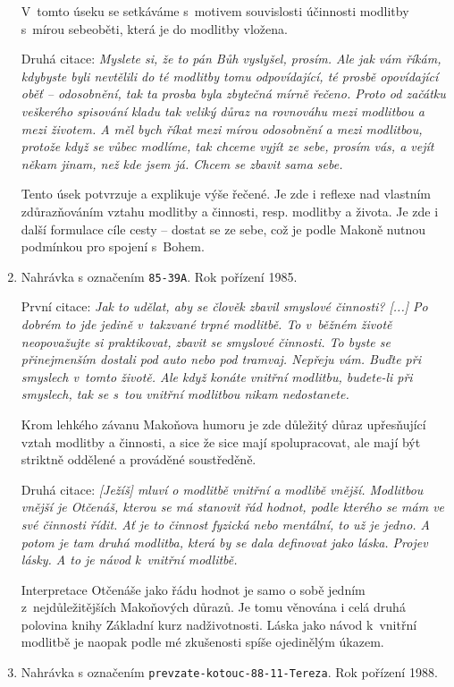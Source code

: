 \begin{enumerate}
{    V~tomto úseku se setkáváme s~motivem souvislosti účinnosti modlitby s~mírou
    sebeoběti, která je do modlitby vložena.

    Druhá citace: \textit{%
      Myslete si, že to pán Bůh vyslyšel, prosím. Ale jak vám říkám, kdybyste
      byli nevtělili do té modlitby tomu odpovídající, té prosbě opovídající
      oběť -- odosobnění, tak ta prosba byla zbytečná mírně řečeno. Proto od
      začátku veškerého spisování kladu tak veliký důraz na rovnováhu mezi
      modlitbou a mezi životem. A měl bych říkat mezi mírou odosobnění a mezi
      modlitbou, protože když se vůbec modlíme, tak chceme vyjít ze sebe, prosím
      vás, a vejít někam jinam, než kde jsem já. Chcem se zbavit sama sebe.
    }

    Tento úsek potvrzuje a explikuje výše řečené. Je zde i reflexe nad vlastním
    zdůrazňováním vztahu modlitby a činnosti, resp. modlitby a života. Je zde i
    další formulace cíle cesty -- dostat se ze sebe, což je podle Makoně nutnou
    podmínkou pro spojení s~Bohem.
  }
  \item{
    Nahrávka s označením \texttt{85-39A}.
    Rok pořízení 1985.

    První citace: \textit{%
      Jak to udělat, aby se člověk zbavil smyslové činnosti? [...] Po dobrém to
      jde jedině v~takzvané trpné modlitbě. To v~běžném životě neopovažujte si
      praktikovat, zbavit se smyslové činnosti. To byste se přinejmenším dostali
      pod auto nebo pod tramvaj. Nepřeju vám. Buďte při smyslech v~tomto životě.
      Ale když konáte vnitřní modlitbu, budete-li při smyslech, tak se s~tou
      vnitřní modlitbou nikam nedostanete.
    }

    Krom lehkého závanu Makoňova humoru je zde důležitý důraz upřesňující vztah
    modlitby a činnosti, a sice že sice mají spolupracovat, ale mají být
    striktně oddělené a prováděné soustředěně.

    Druhá citace: \textit{%
      [Ježíš] mluví o modlitbě vnitřní a modlibě vnější. Modlitbou vnější je
      Otčenáš, kterou se má stanovit řád hodnot, podle kterého se mám ve své
      činnosti řídit. Ať je to činnost fyzická nebo mentální, to už je jedno. A
      potom je tam druhá modlitba, která by se dala definovat jako láska. Projev
      lásky. A to je návod k~vnitřní modlitbě.
    }

    Interpretace Otčenáše jako řádu hodnot je samo o sobě jedním
    z~nejdůležitějších Makoňových důrazů. Je tomu věnována i celá druhá polovina
    knihy Základní kurz nadživotnosti\cite{KaMaZKN}. Láska jako návod k~vnitřní
    modlitbě je naopak podle mé zkušenosti spíše ojedinělým úkazem.
  }
  \item{
    Nahrávka s označením \texttt{prevzate-kotouc-88-11-Tereza}.
    Rok pořízení 1988.

}
\end{enumerate}
